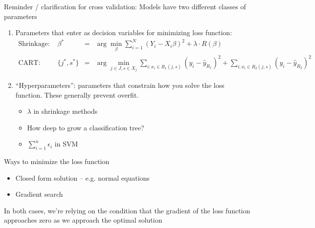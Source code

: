 \documentclass[mathserif, aspectratio=169, xcolor=table]{beamer}
\begin{document}
\begin{frame}{Reminder / clarification for cross validation:  Models have two different classes of parameters}
	\begin{enumerate}
		\item Parameters that enter as decision variables for minimizing loss function:
		\begin{align*}
			\text{Shrinkage: } & \beta^*  &=& \arg \min_\beta \sum_{i=1}^N \left(Y_i - X_i \beta \right)^2+\lambda \cdot R(\beta)\\
			\text{CART: } & \{j^*,s^*\}  &=& \arg \min_{j\in J, s\in X_j} \sum_{i:x_i\in R_1(j,s)} (y_i-\hat{y}_{R_1})^2 + \sum_{i:x_i\in R_2(j,s)} (y_i-\hat{y}_{R_2})^2
		\end{align*}
		\item ``Hyperparameters'': parameters that constrain how you solve the loss function.  These generally prevent overfit.
		\begin{itemize} \pause
			\item $\lambda$ in shrinkage methods
			\item How deep to grow a classification tree?
			\item $\sum_{i=1}^n \epsilon_i$ in SVM
		\end{itemize}
	\end{enumerate}
	
\end{frame}

\begin{frame}{Ways to minimize the loss function}
\pause
	\begin{itemize}
		\item Closed form solution -- e.g. normal equations
		\item Gradient search
	\end{itemize}


	In both cases, we're relying on the condition that the gradient of the loss function approaches zero as we approach the optimal solution 
\end{frame}
\end{document}
